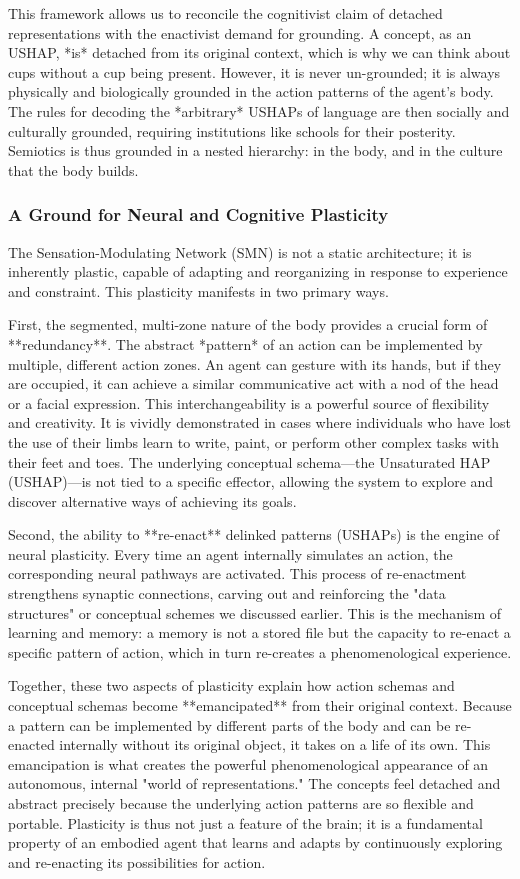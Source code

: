 This framework allows us to reconcile the cognitivist claim of detached representations with the enactivist demand for grounding. A concept, as an USHAP, *is* detached from its original context, which is why we can think about cups without a cup being present. However, it is never un-grounded; it is always physically and biologically grounded in the action patterns of the agent's body. The rules for decoding the *arbitrary* USHAPs of language are then socially and culturally grounded, requiring institutions like schools for their posterity. Semiotics is thus grounded in a nested hierarchy: in the body, and in the culture that the body builds.

\subsubsection{A Ground for Neural and Cognitive Plasticity}
\label{ssubsec:plasticity}
The Sensation-Modulating Network (SMN) is not a static architecture; it is inherently plastic, capable of adapting and reorganizing in response to experience and constraint. This plasticity manifests in two primary ways.

First, the segmented, multi-zone nature of the body provides a crucial form of **redundancy**. The abstract *pattern* of an action can be implemented by multiple, different action zones. An agent can gesture with its hands, but if they are occupied, it can achieve a similar communicative act with a nod of the head or a facial expression. This interchangeability is a powerful source of flexibility and creativity. It is vividly demonstrated in cases where individuals who have lost the use of their limbs learn to write, paint, or perform other complex tasks with their feet and toes. The underlying conceptual schema—the Unsaturated HAP (USHAP)—is not tied to a specific effector, allowing the system to explore and discover alternative ways of achieving its goals.

Second, the ability to **re-enact** delinked patterns (USHAPs) is the engine of neural plasticity. Every time an agent internally simulates an action, the corresponding neural pathways are activated. This process of re-enactment strengthens synaptic connections, carving out and reinforcing the "data structures" or conceptual schemes we discussed earlier. This is the mechanism of learning and memory: a memory is not a stored file but the capacity to re-enact a specific pattern of action, which in turn re-creates a phenomenological experience.

Together, these two aspects of plasticity explain how action schemas and conceptual schemas become **emancipated** from their original context. Because a pattern can be implemented by different parts of the body and can be re-enacted internally without its original object, it takes on a life of its own. This emancipation is what creates the powerful phenomenological appearance of an autonomous, internal "world of representations." The concepts feel detached and abstract precisely because the underlying action patterns are so flexible and portable. Plasticity is thus not just a feature of the brain; it is a fundamental property of an embodied agent that learns and adapts by continuously exploring and re-enacting its possibilities for action.